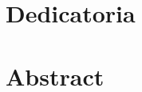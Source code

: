 \documentclass[11pt, oneside, headings=twolinechapter]{scrreprt}
\begin{document}

%

\chapter*{Dedicatoria}
\clearpage
\chapter*{Abstract}
\clearpage

\tableofcontents


\cleardoublepage
{}%


\end{document}
